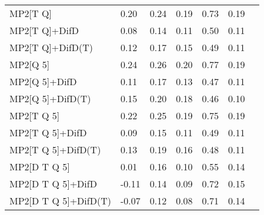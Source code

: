 \begin{table}
\begin{tabular}{l l l l l l l }
    MP2[T Q] & 0.20 & 0.24 & 0.19 & 0.73 & 0.19 \\ 
    MP2[T Q]+DifD & 0.08 & 0.14 & 0.11 & 0.50 & 0.11 \\ 
    MP2[T Q]+DifD(T) & 0.12 & 0.17 & 0.15 & 0.49 & 0.11 \\ 
    MP2[Q 5] & 0.24 & 0.26 & 0.20 & 0.77 & 0.19 \\ 
    MP2[Q 5]+DifD & 0.11 & 0.17 & 0.13 & 0.47 & 0.11 \\ 
    MP2[Q 5]+DifD(T) & 0.15 & 0.20 & 0.18 & 0.46 & 0.10 \\ 
    MP2[T Q 5] & 0.22 & 0.25 & 0.19 & 0.75 & 0.19 \\ 
    MP2[T Q 5]+DifD & 0.09 & 0.15 & 0.11 & 0.49 & 0.11 \\ 
    MP2[T Q 5]+DifD(T) & 0.13 & 0.19 & 0.16 & 0.48 & 0.11 \\ 
    MP2[D T Q 5] & 0.01 & 0.16 & 0.10 & 0.55 & 0.14 \\ 
    MP2[D T Q 5]+DifD & -0.11 & 0.14 & 0.09 & 0.72 & 0.15 \\ 
    MP2[D T Q 5]+DifD(T) & -0.07 & 0.12 & 0.08 & 0.71 & 0.14 \\ 
    \bottomrule
  \end{tabular}
\end{table}
